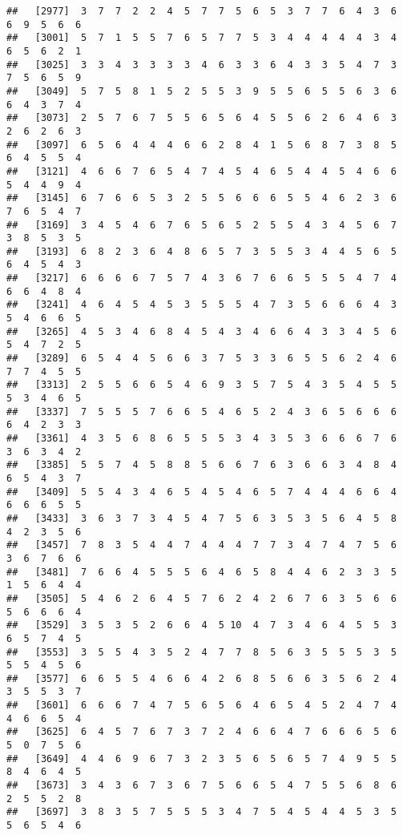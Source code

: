 \documentclass[
]{book}
\begin{document}
\begin{verbatim}
##   [2977]  3  7  7  2  2  4  5  7  7  5  6  5  3  7  7  6  4  3  6  6  9  5  6  6
##   [3001]  5  7  1  5  5  7  6  5  7  7  5  3  4  4  4  4  4  3  4  6  5  6  2  1
##   [3025]  3  3  4  3  3  3  3  4  6  3  3  6  4  3  3  5  4  7  3  7  5  6  5  9
##   [3049]  5  7  5  8  1  5  2  5  5  3  9  5  5  6  5  5  6  3  6  6  4  3  7  4
##   [3073]  2  5  7  6  7  5  5  6  5  6  4  5  5  6  2  6  4  6  3  2  6  2  6  3
##   [3097]  6  5  6  4  4  4  6  6  2  8  4  1  5  6  8  7  3  8  5  6  4  5  5  4
##   [3121]  4  6  6  7  6  5  4  7  4  5  4  6  5  4  4  5  4  6  6  5  4  4  9  4
##   [3145]  6  7  6  6  5  3  2  5  5  6  6  6  5  5  4  6  2  3  6  7  6  5  4  7
##   [3169]  3  4  5  4  6  7  6  5  6  5  2  5  5  4  3  4  5  6  7  3  8  5  3  5
##   [3193]  6  8  2  3  6  4  8  6  5  7  3  5  5  3  4  4  5  6  5  6  4  5  4  3
##   [3217]  6  6  6  6  7  5  7  4  3  6  7  6  6  5  5  5  4  7  4  6  6  4  8  4
##   [3241]  4  6  4  5  4  5  3  5  5  5  4  7  3  5  6  6  6  4  3  5  4  6  6  5
##   [3265]  4  5  3  4  6  8  4  5  4  3  4  6  6  4  3  3  4  5  6  5  4  7  2  5
##   [3289]  6  5  4  4  5  6  6  3  7  5  3  3  6  5  5  6  2  4  6  7  7  4  5  5
##   [3313]  2  5  5  6  6  5  4  6  9  3  5  7  5  4  3  5  4  5  5  5  3  4  6  5
##   [3337]  7  5  5  5  7  6  6  5  4  6  5  2  4  3  6  5  6  6  6  6  4  2  3  3
##   [3361]  4  3  5  6  8  6  5  5  5  3  4  3  5  3  6  6  6  7  6  3  6  3  4  2
##   [3385]  5  5  7  4  5  8  8  5  6  6  7  6  3  6  6  3  4  8  4  6  5  4  3  7
##   [3409]  5  5  4  3  4  6  5  4  5  4  6  5  7  4  4  4  6  6  4  6  6  6  5  5
##   [3433]  3  6  3  7  3  4  5  4  7  5  6  3  5  3  5  6  4  5  8  4  2  3  5  6
##   [3457]  7  8  3  5  4  4  7  4  4  4  7  7  3  4  7  4  7  5  6  3  6  7  6  6
##   [3481]  7  6  6  4  5  5  5  6  4  6  5  8  4  4  6  2  3  3  5  1  5  6  4  4
##   [3505]  5  4  6  2  6  4  5  7  6  2  4  2  6  7  6  3  5  6  6  5  6  6  6  4
##   [3529]  3  5  3  5  2  6  6  4  5 10  4  7  3  4  6  4  5  5  3  6  5  7  4  5
##   [3553]  3  5  5  4  3  5  2  4  7  7  8  5  6  3  5  5  5  3  5  5  5  4  5  6
##   [3577]  6  6  5  5  4  6  6  4  2  6  8  5  6  6  3  5  6  2  4  3  5  5  3  7
##   [3601]  6  6  6  7  4  7  5  6  5  6  4  6  5  4  5  2  4  7  4  4  6  6  5  4
##   [3625]  6  4  5  7  6  7  3  7  2  4  6  6  4  7  6  6  6  5  6  5  0  7  5  6
##   [3649]  4  4  6  9  6  7  3  2  3  5  6  5  6  5  7  4  9  5  5  8  4  6  4  5
##   [3673]  3  4  3  6  7  3  6  7  5  6  6  5  4  7  5  5  6  8  6  2  5  5  2  8
##   [3697]  3  8  3  5  7  5  5  5  3  4  7  5  4  5  4  4  5  3  5  5  6  5  4  6

\end{verbatim}
\end{document}
